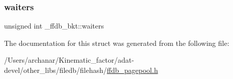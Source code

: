 \subsubsection{\texorpdfstring{waiters}{waiters}}
{\footnotesize\ttfamily unsigned int \+\_\+ffdb\+\_\+bkt\+::waiters}



The documentation for this struct was generated from the following file\+:\begin{DoxyCompactItemize}
\item 
/\+Users/archanar/\+Kinematic\+\_\+factor/adat-\/devel/other\+\_\+libs/filedb/filehash/\mbox{\hyperlink{adat-devel_2other__libs_2filedb_2filehash_2ffdb__pagepool_8h}{ffdb\+\_\+pagepool.\+h}}\end{DoxyCompactItemize}
